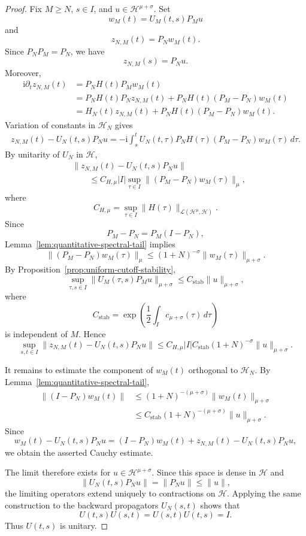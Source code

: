 \documentclass[11pt]{amsart}
\theoremstyle{plain}
\theoremstyle{definition}
\theoremstyle{remark}
\newcommand{\Hilb}{\mathcal H}
\newcommand{\ii}{\mathrm i}
\begin{document}
\begin{proof}
Fix \(M\geq N\), \(s\in I\), and
\(u\in\Hilb^{\mu+\sigma}\). Set
\[
w_{M}(t)=U_{M}(t,s)P_{M}u
\]
and
\[
z_{N,M}(t)=P_{N}w_{M}(t).
\]
Since \(P_{N}P_{M}=P_{N}\), we have
\[
z_{N,M}(s)=P_{N}u.
\]
Moreover,
\[
\begin{split}
\ii\partial_{t}z_{N,M}(t)
&=
P_{N}H(t)P_{M}w_{M}(t)
\\
&=
P_{N}H(t)P_{N}z_{N,M}(t)
+
P_{N}H(t)(P_{M}-P_{N})w_{M}(t)
\\
&=
H_{N}(t)z_{N,M}(t)
+
P_{N}H(t)(P_{M}-P_{N})w_{M}(t).
\end{split}
\]
Variation of constants in \(\Hilb_{N}\) gives
\[
\begin{split}
z_{N,M}(t)-U_{N}(t,s)P_{N}u
=
-\ii
\int_{s}^{t}
U_{N}(t,\tau)
P_{N}H(\tau)(P_{M}-P_{N})w_{M}(\tau)\,d\tau.
\end{split}
\]
By unitarity of \(U_{N}\) in \(\Hilb\),
\[
\begin{split}
&\|z_{N,M}(t)-U_{N}(t,s)P_{N}u\|
\\
&\qquad\leq
C_{H,\mu}|I|
\sup_{\tau\in I}
\|(P_{M}-P_{N})w_{M}(\tau)\|_{\mu},
\end{split}
\]
where
\[
C_{H,\mu}
=
\sup_{\tau\in I}
\|H(\tau)\|_{\mathcal{L}(\Hilb^{\mu},\Hilb)}.
\]
Since
\[
P_{M}-P_{N}=P_{M}(I-P_{N}),
\]
Lemma~\ref{lem:quantitative-spectral-tail} implies
\[
\|(P_{M}-P_{N})w_{M}(\tau)\|_{\mu}
\leq
(1+N)^{-\sigma}\|w_{M}(\tau)\|_{\mu+\sigma}.
\]
By Proposition~\ref{prop:uniform-cutoff-stability},
\[
\sup_{\tau,s\in I}
\|U_{M}(\tau,s)P_{M}u\|_{\mu+\sigma}
\leq
C_{\mathrm{stab}}\|u\|_{\mu+\sigma},
\]
where
\[
C_{\mathrm{stab}}
=
\exp\left(
\frac{1}{2}\int_{I}c_{\mu+\sigma}(\tau)\,d\tau
\right)
\]
is independent of \(M\). Hence
\[
\sup_{s,t\in I}
\|z_{N,M}(t)-U_{N}(t,s)P_{N}u\|
\leq
C_{H,\mu}|I|C_{\mathrm{stab}}
(1+N)^{-\sigma}
\|u\|_{\mu+\sigma}.
\]

It remains to estimate the component of \(w_{M}(t)\) orthogonal to
\(\Hilb_{N}\). By Lemma~\ref{lem:quantitative-spectral-tail},
\[
\begin{split}
\|(I-P_{N})w_{M}(t)\|
&\leq
(1+N)^{-(\mu+\sigma)}
\|w_{M}(t)\|_{\mu+\sigma}
\\
&\leq
C_{\mathrm{stab}}
(1+N)^{-(\mu+\sigma)}
\|u\|_{\mu+\sigma}.
\end{split}
\]
Since
\[
w_{M}(t)-U_{N}(t,s)P_{N}u
=
(I-P_{N})w_{M}(t)
+
z_{N,M}(t)-U_{N}(t,s)P_{N}u,
\]
we obtain the asserted Cauchy estimate.

The limit therefore exists for
\(u\in\Hilb^{\mu+\sigma}\). Since this space is dense in
\(\Hilb\) and
\[
\|U_{N}(t,s)P_{N}u\|=\|P_{N}u\|\leq\|u\|,
\]
the limiting operators extend uniquely to contractions on \(\Hilb\).
Applying the same construction to the backward propagators \(U_{N}(s,t)\)
shows that
\[
U(t,s)U(s,t)=U(s,t)U(t,s)=I.
\]
Thus \(U(t,s)\) is unitary.


\end{proof}
\end{document}
